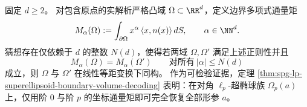 \begin{conjecture}[边界多项式通量的有限阶全息完备性]\label{conj:spg-boundary-polynomial-flux-finite-order-completeness}
固定 \(d\ge 2\)。
对包含原点的实解析严格凸域 \(\Omega\subset\RR^d\)，定义边界多项式通量矩
\[
M_\alpha(\Omega):=\int_{\partial\Omega} x^\alpha\,\langle x,n(x)\rangle\,dS,
\qquad \alpha\in\NN^d.
\]
猜想存在仅依赖于 \(d\) 的整数 \(N(d)\)，使得若两域 \(\Omega,\Omega'\) 满足上述正则性并且
\[
M_\alpha(\Omega)=M_\alpha(\Omega')\qquad\text{对所有}\ |\alpha|\le N(d)
\]
成立，则 \(\Omega\) 与 \(\Omega'\) 在线性等距变换下同构。
作为可检验证据，定理 \ref{thm:spg-lp-superellipsoid-boundary-volume-decoding} 表明：在对角 \(\ell_p\)-超椭球族 \(\Omega_p(a)\) 上，仅用阶 \(0\) 与阶 \(p\) 的坐标通量矩即可完全恢复全部形参 \(a\)。
\end{conjecture}

\endinput
